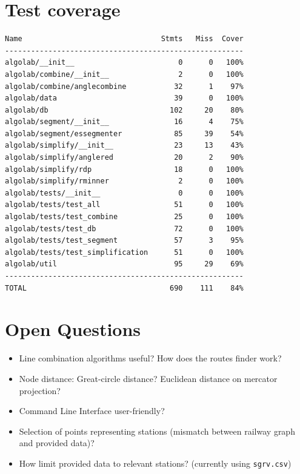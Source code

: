 \documentclass[twoside]{scrartcl}
\begin{document}
\section{Test coverage}
\begin{verbatim}
Name                                Stmts   Miss  Cover
-------------------------------------------------------
algolab/__init__                        0      0   100%
algolab/combine/__init__                2      0   100%
algolab/combine/anglecombine           32      1    97%
algolab/data                           39      0   100%
algolab/db                            102     20    80%
algolab/segment/__init__               16      4    75%
algolab/segment/essegmenter            85     39    54%
algolab/simplify/__init__              23     13    43%
algolab/simplify/anglered              20      2    90%
algolab/simplify/rdp                   18      0   100%
algolab/simplify/rminner                2      0   100%
algolab/tests/__init__                  0      0   100%
algolab/tests/test_all                 51      0   100%
algolab/tests/test_combine             25      0   100%
algolab/tests/test_db                  72      0   100%
algolab/tests/test_segment             57      3    95%
algolab/tests/test_simplification      51      0   100%
algolab/util                           95     29    69%
-------------------------------------------------------
TOTAL                                 690    111    84%
\end{verbatim}

\section{Open Questions}
\begin{itemize}
    \item Line combination algorithms useful? How does the routes finder work?
    \item Node distance: Great-circle distance? Euclidean distance on mercator projection?
    \item Command Line Interface user-friendly?
    \item Selection of points representing stations (mismatch between railway graph and provided data)?
    \item How limit provided data to relevant stations? (currently using \texttt{sgrv.csv})
\end{itemize}

\newpage
\end{document}
